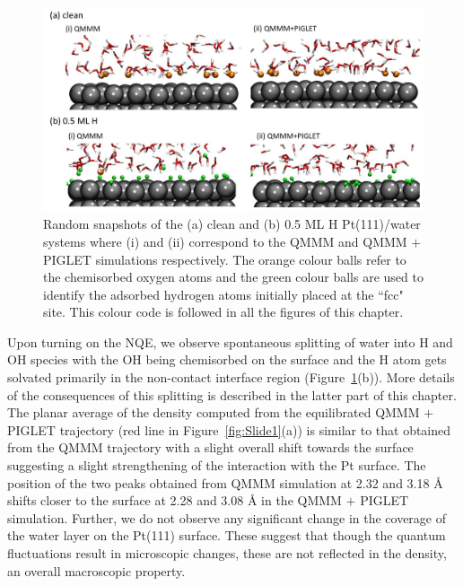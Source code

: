\begin{figure}
   \begin{center}
    \includegraphics[width=15cm]{./Chapter3/figures/Slide8.JPG}       
   \end{center}
    \caption{Random snapshots of the (a) clean and (b) 0.5 ML H Pt(111)/water systems where (i) and (ii) correspond to the QMMM and QMMM $+$ PIGLET simulations respectively. The orange colour  balls refer to the chemisorbed oxygen atoms and the green colour balls are used to identify the adsorbed hydrogen atoms initially placed at the ``fcc" site. This colour code is followed in all the figures of this chapter. }
  \label{fig:Slide8}
\end{figure}

Upon turning on the NQE, we observe spontaneous splitting of water into
H and OH species with the OH being chemisorbed on the surface and the
H atom gets solvated primarily in the non-contact interface region (Figure~\ref{fig:Slide8}(b)). More details of the 
consequences of this splitting is described in the latter part of this
chapter. The planar average of the density computed from the equilibrated
QMMM $+$ PIGLET trajectory (red line in Figure~\ref{fig:Slide1}(a)) is similar
to that obtained from the QMMM trajectory with a slight overall shift towards
the surface suggesting a slight strengthening of the interaction
with the Pt surface. The position of the two peaks obtained from 
QMMM simulation at 2.32 and 3.18 \AA{} shifts closer to the 
surface at 2.28 and 3.08 \AA{} in the QMMM $+$ PIGLET simulation. Further,
we do not observe any significant change in the coverage of the water
layer on the Pt(111) surface. These suggest that though the quantum
fluctuations result in microscopic changes, these are not reflected
in the density, an overall macroscopic property.

